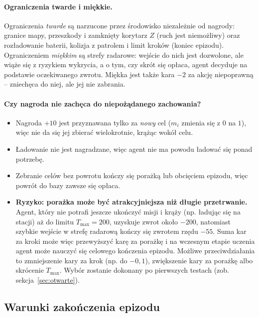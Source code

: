 \paragraph{Ograniczenia twarde i miękkie.} Ograniczenia \emph{twarde} są
narzucone przez środowisko niezależnie od nagrody: granice mapy, przeszkody
i zamknięty korytarz $Z$ (ruch jest niemożliwy) oraz rozładowanie baterii,
kolizja z patrolem i limit kroków (koniec epizodu). Ograniczeniem
\emph{miękkim} są strefy radarowe: wejście do nich jest dozwolone, ale wiąże
się z ryzykiem wykrycia, a o tym, czy skrót się opłaca, agent decyduje na
podstawie oczekiwanego zwrotu. Miękka jest także kara $-2$ za akcję
niepoprawną -- zniechęca do niej, ale jej nie zabrania.

\paragraph{Czy nagroda nie zachęca do niepożądanego zachowania?}
\begin{itemize}
  \item Nagroda $+10$ jest przyznawana tylko za \emph{nowy} cel
        ($m_i$ zmienia się z $0$ na $1$), więc nie da się jej zbierać
        wielokrotnie, krążąc wokół celu.
  \item Ładowanie nie jest nagradzane, więc agent nie ma powodu ładować się
        ponad potrzebę.
  \item Zebranie celów bez powrotu kończy się porażką lub obcięciem epizodu,
        więc powrót do bazy zawsze się opłaca.
  \item \textbf{Ryzyko: porażka może być atrakcyjniejsza niż długie
        przetrwanie.} Agent, który nie potrafi jeszcze ukończyć misji
        i krąży (np. ładując się na stacji) aż do limitu $T_{\max} = 200$,
        uzyskuje zwrot około $-200$, natomiast szybkie wejście w strefę
        radarową kończy się zwrotem rzędu $-55$. Suma kar za kroki może więc
        przewyższyć karę za porażkę i na wczesnym etapie uczenia agent może
        nauczyć się celowego kończenia epizodu. Możliwe przeciwdziałania to
        zmniejszenie kary za krok (np. do $-0{,}1$), zwiększenie kary za
        porażkę albo skrócenie $T_{\max}$. Wybór zostanie dokonany po
        pierwszych testach (zob. sekcja~\ref{sec:otwarte}).
\end{itemize}

\subsection{Warunki zakończenia epizodu}
\label{sec:koniec}

